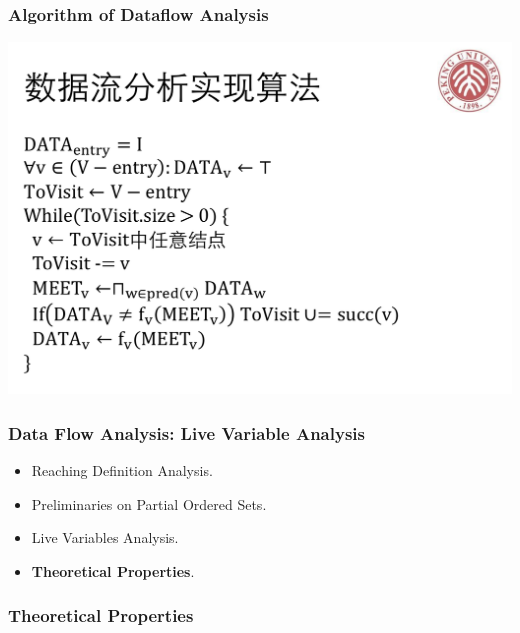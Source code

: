 \documentclass[aspectratio=1610, 13pt]{beamer}
\begin{document}
\begin{frame}\frametitle{Algorithm of Dataflow Analysis}
\begin{center}
\includegraphics[scale=0.25]{algorithm.png}

\end{center}
\end{frame}

\begin{frame}\frametitle{Data Flow Analysis: Live Variable Analysis}
\begin{itemize}
\item Reaching Definition Analysis.
\item Preliminaries on Partial Ordered Sets.
\item Live Variables Analysis.
\item\textbf{Theoretical Properties}.


\end{itemize}
\end{frame}
\begin{frame}\frametitle{Theoretical Properties}

 
 
\end{frame}
\end{document}

